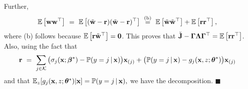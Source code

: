 Further, 
$$
\mathbb{E}\left[\mathbf{w} \mathbf{w}^{\top} \right] ~=~ \mathbb{E}\left[(\tilde{\mathbf{w}} - \mathbf{r})(\tilde{\mathbf{w}} - \mathbf{r})^{\top} \right] ~\stackrel{\text{(b)}}{=}~
\mathbb{E}\left[\tilde{\mathbf{w}}\tilde{\mathbf{w}}^{\top} \right] + \mathbb{E}\left[\mathbf{r}\mathbf{r}^{\top} \right],
$$
where (b) follows because $\mathbb{E}\left[
\mathbf{r}\tilde{\mathbf{w}}^{\top}\right] = \bm{0}$.
This proves that 
$\check{\mathbf{J}} - \bm{\Gamma}\bm{\Lambda}\bm{\Gamma}^{\top} = \mathbb{E}\left[\mathbf{r}\mathbf{r}^{\top} \right]$. 
Also, 
using the fact that 
$$
\mathbf{r}~=~\sum_{j\in \mathcal{K}}\big(\sigma_{j}(\mathbf{x}; \bm{\beta}^*) 
 - \mathbb{P}(y = j\,|\,\mathbf{x})\big)\mathbf{x}_{(j)} + \big(\mathbb{P}(y = j\,|\,\mathbf{x}) - g_{j}(\mathbf{x}, z; \bm{\theta}^*)\big)\mathbf{x}_{(j)}
$$
and that $\mathbb{E}_{z}[g_{j}(\mathbf{x}, z; \bm{\theta}^*)|\mathbf{x}] = \mathbb{P}(y = j\,|\,\mathbf{x}),$ 
we have the decomposition. 
\hfill $\blacksquare$
\vspace{3mm}

\vspace{3mm}
